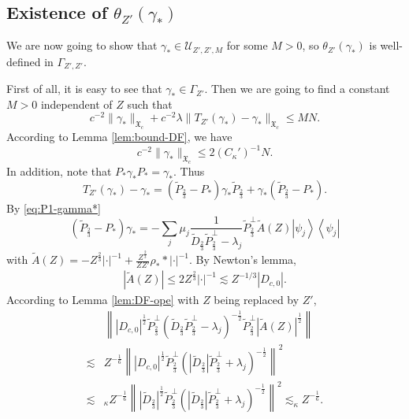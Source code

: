\documentclass[a4paper]{amsart}
\def\cU{{\mathcal U}}
\def\gX{\mathfrak{X}}
\begin{document}
\subsection{Existence of $\theta_{Z'}(\gamma_*)$} We are now going to
show that $\gamma_*\in \cU_{Z',Z',M}$ 
for some $M>0$, so
$\theta_{Z'}(\gamma_*)$ is well-defined in $\Gamma_{Z',Z'}$.

First of all, it is easy to see that $\gamma_*\in \Gamma_{Z'}$. Then
we are going to find a constant $M>0$ independent of $Z$ such that
\begin{equation}
     c^{-2} \|\gamma_*\|_{\gX_c}+c^{-2} \lambda\|T_{Z'}(\gamma_*)-\gamma_*\|_{\gX_c}\leq MN.
\end{equation}
According to Lemma \ref{lem:bound-DF}, we have
\begin{equation}
    c^{-2}\|\gamma_*\|_{\gX_c}\leq 2(C_\kappa')^{-1}N.
\end{equation}
In addition, note that $P_*\gamma_* P_*=\gamma_*$. Thus
\begin{equation}
    T_{Z'}(\gamma_*)-\gamma_*= (\widetilde{P}_{\frac23}-P_*)\gamma_*\widetilde{P}_{\frac23}+\gamma_*(\widetilde{P}_{\frac23}-P_*).
\end{equation}
By \eqref{eq:P1-gamma*}
\begin{equation}
  (\widetilde{P}_{\frac23}-P_*)\gamma_*= -\sum_{j}\mu_j \frac{1}{\widetilde{D}_{\frac23} \widetilde{P}_{\frac23}^\perp -\lambda_j} \widetilde{P}_{\frac23}^\perp \widetilde{A}(Z)\left|\psi_j\right>\left<\psi_j\right|
\end{equation}
with
$\widetilde{A}(Z)=
-Z^{\frac23}|\cdot|^{-1}+\frac{Z^{\frac23}}{ZZ'}\rho_{*}*|\cdot|^{-1}$.
By Newton's lemma,
\begin{align*}
     |\widetilde{A}(Z)|\leq 2Z^{\frac23}|\cdot|^{-1}\lesssim Z^{-1/3}|D_{c,0}|.
\end{align*}
According to Lemma \ref{lem:DF-ope} with $Z$ being replaced by
$Z'$,
\begin{equation}\label{eq:4.1}
  \begin{split}
 &   \left\||D_{c,0}|^{\frac12}\widetilde{P}_{\frac23}^\perp (\widetilde{D}_{\frac23} \widetilde{P}_{\frac23}^\perp -\lambda_j)^{-\frac12} \widetilde{P}_{\frac23}^\perp |\widetilde{A}(Z)|^{\frac12} \right\|\\
    \lesssim &Z^{-\frac16}\left\||D_{c,0}|^{\frac12}\widetilde{P}_{\frac23}^\perp
               (|\widetilde{D}_{\frac23}| \widetilde{P}_{\frac23}^\perp +\lambda_j)^{-\frac12}\right\|^2\\
    \lesssim&_\kappa Z^{-\frac16}\left\||\widetilde{D}_{\frac23}|^{\frac12}\widetilde{P}_{\frac23}^\perp (|\widetilde{D}_{\frac23}| \widetilde{P}_{\frac23}^\perp +\lambda_j)^{-\frac12}\right\|^2 \lesssim_\kappa Z^{-\frac16}.
  \end{split}
\end{equation}
\end{document}
